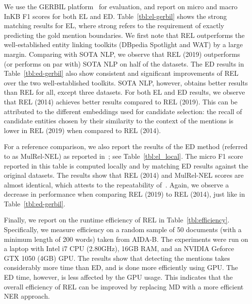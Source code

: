 \documentclass[sigconf]{acmart}
\begin{document}
We use the GERBIL platform~\cite{Roder:2018:Gerbil} for evaluation, and report on micro and macro InKB F1 scores for both EL and ED. Table~\ref{tbl:el-gerbil} shows the strong matching results for EL, where strong refers to the requirement of  exactly predicting the gold mention boundaries. We first note that REL outperforms the well-established entity linking toolkits (DBpedia Spotlight and WAT) by a large margin. Comparing with SOTA NLP, we observe that REL (2019) outperforms (or performs on par with) SOTA NLP on half of the datasets. 
The ED results in Table~\ref{tbl:ed-gerbil} also show consistent and significant improvements of REL over the two well-established toolkits. SOTA NLP, however, obtains better results than REL for all, except three datasets.
For both EL and ED results, we observe that REL (2014) achieves better results compared to REL (2019). This can be attributed to the different embeddings used for candidate selection: the recall of candidate entities chosen by their similarity to the context of the mentions is lower in REL (2019) when compared to REL (2014).

For a reference comparison, we also report the results of the ED method (referred to as MulRel-NEL) as reported in~\cite{Le:2018:IEL}; see Table~\ref{tbl:el_local}. The micro F1 score reported in this table is computed locally and by matching ED results against the original datasets. The results show that REL (2014) and MulRel-NEL scores are almost identical, which attests to the repeatability of~\cite{Le:2018:IEL}. Again, we observe a decrease in performance when comparing REL (2019) to REL (2014), just like in Table~\ref{tbl:ed-gerbil}.

Finally, we report on the runtime efficiency of REL in Table~\ref{tbl:efficiency}.  Specifically, we measure efficiency on a random sample of 50 documents (with a minimum length of 200 words) taken from AIDA-B.  
The experiments were run on a laptop with Intel i7 CPU (2.80GHz), 16GB RAM, and an NVIDIA Geforce GTX 1050 (4GB) GPU. The results show that detecting the mentions takes considerably more time than ED, and is done more efficiently using GPU. The ED time, however, is less affected by the GPU usage. This indicates that the overall efficiency of REL can be improved by replacing MD with a more efficient NER approach.
\end{document}
